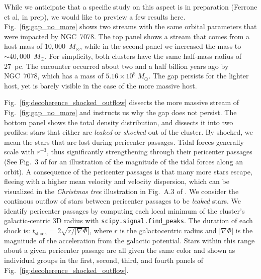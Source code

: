 \documentclass{aa}
\begin{document}
\begin{appendix}
    While we anticipate that a specific study on this aspect is in preparation (Ferrone et al, in prep), we would like to preview a few results here. Fig.~\ref{fig:gap_no_more} shows two streams with the same orbital parameters that were impacted by NGC~7078. The top panel shows a stream that comes from a host mass of $10,000$~$M_\odot$, while in the second panel we increased the mass to $\sim40,000$~$M_\odot$. For simplicity, both clusters have the same half-mass radius of 27~pc. The encounter occurred about two and a half billion years ago by NGC~7078, which has a mass of $5.16\times10^{5}~M_\odot$. The gap persists for the lighter host, yet is barely visible in the case of the more massive host. 

    Fig.~\ref{fig:decoherence_shocked_outflow} dissects the more massive stream of Fig.~\ref{fig:gap_no_more} and instructs us why the gap does not persist. The bottom panel shows the total density distribution, and dissects it into two profiles: stars that either are \textit{leaked} or \textit{shocked} out of the cluster. By shocked, we mean the stars that are lost during pericenter passages. Tidal forces generally scale with $r^{-3}$, thus significantly strengthening through their pericenter passages (See Fig.~3 of \citet{2004AJ....127.2753D} for an illustration of the magnitude of the tidal forces along an orbit). A consequence of the pericenter passages is that many more stars escape, fleeing with a higher mean velocity and velocity dispersion, which can be visualized in the \textit{Christmas tree} illustration in Fig.~A.3 of \citet{2012A&A...546L...7M}. We consider the continous outflow of stars between pericenter passages to be \textit{leaked} stars. We identify pericenter passages by computing each local minimum of the cluster's galactic-centric 3D radius with \texttt{scipy.signal.find\_peaks}. The duration of each shock is: $t_{\textrm{shock}}$ = 2$\sqrt{r/|\nabla\Phi|}$, where $r$ is the galactocentric radius and $|\nabla\Phi|$ is the magnitude of the acceleration from the galactic potential. Stars within this range about a given pericenter passage are all given the same color and shown as individual groups in the first, second, third, and fourth panels of Fig.~\ref{fig:decoherence_shocked_outflow}.



\end{appendix}
\end{document}
